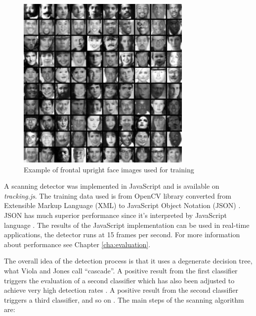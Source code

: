 \begin{figure}[!htb]
  \centering
  \includegraphics[width=240pt]{chapters/computer_vision_library_for_the_web/viola_training.png}
  \caption{Example of frontal upright face images used for training \cite{Viola2001}}
  \label{figure:viola_training}
\end{figure}

A scanning detector was implemented in JavaScript \cite{International2009} and is available on \textit{tracking.js}. The training data used is from OpenCV library \cite{Bradski2000} converted from Extensible Markup Language (XML) \cite{Bray2013} to JavaScript Object Notation (JSON) \cite{Crockford2013}. JSON \cite{Crockford2013} has much superior performance since it's interpreted by JavaScript language \cite{International2009,Crockford2013}. The results of the JavaScript \cite{International2009} implementation can be used in real-time applications, the detector runs at 15 frames per second. For more information about performance see Chapter \ref{cha:evaluation}.

The overall idea of the detection process is that it uses a degenerate decision tree, what Viola and Jones \cite{Viola2001} call ``cascade''. A positive result from the first classifier triggers the evaluation of a second classifier which has also been adjusted to achieve very high detection rates \cite{Viola2001}. A positive result from the second classifier triggers a third classifier, and so on \cite{Viola2001}. The main steps of the scanning algorithm are:

